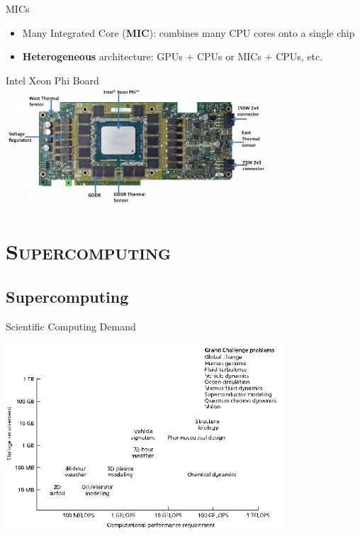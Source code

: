 \documentclass[xcolor=x11names,compress]{beamer}
\renewcommand{\(}{\begin{columns}}
\renewcommand{\)}{\end{columns}}
\newcommand{\<}[1]{\begin{column}{#1}}
\renewcommand{\>}{\end{column}}
\begin{document}
\begin{frame}{MICs}
\begin{itemize}
\item  Many Integrated Core (\textbf{MIC}): combines many CPU cores onto a single chip
\item \textbf{Heterogeneous} architecture: GPUs + CPUs or MICs + CPUs, etc.
\end{itemize}

\begin{center}
Intel Xeon Phi Board\\ \vspace*{1 em}
\includegraphics[height=1.75in,clip]{Intel-Xeon-Phi-Board}
\end{center}
\end{frame}

\section{\scshape Supercomputing}
\subsection{Supercomputing}
\begin{frame}{Scientific Computing Demand}

\begin{center}
\includegraphics[height=2.75in,clip]{MemoryNeeds}
\end{center}

\end{frame}
\end{document}
